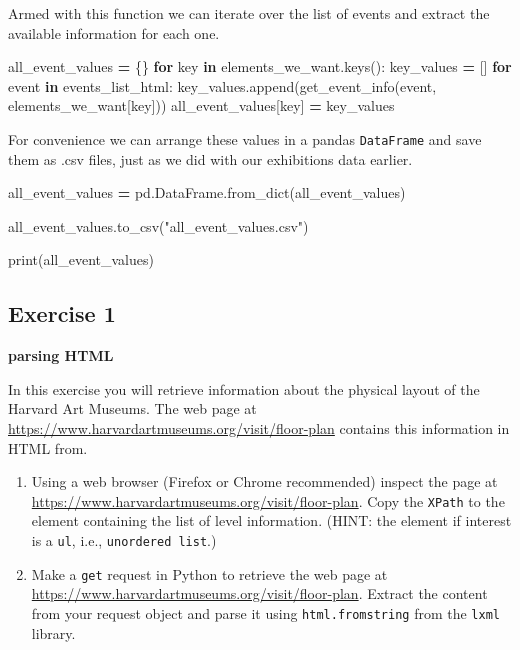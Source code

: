 \documentclass[]{book}
\newenvironment{Shaded}{\begin{snugshade}}{\end{snugshade}}
\newcommand{\BuiltInTok}[1]{#1}
\newcommand{\ControlFlowTok}[1]{\textcolor[rgb]{0.13,0.29,0.53}{\textbf{#1}}}
\newcommand{\KeywordTok}[1]{\textcolor[rgb]{0.13,0.29,0.53}{\textbf{#1}}}
\newcommand{\NormalTok}[1]{#1}
\newcommand{\OperatorTok}[1]{\textcolor[rgb]{0.81,0.36,0.00}{\textbf{#1}}}
\newcommand{\StringTok}[1]{\textcolor[rgb]{0.31,0.60,0.02}{#1}}
\begin{document}
Armed with this function we can iterate over the list of events and extract the available information for each one.

\begin{Shaded}
\begin{Highlighting}[]
\NormalTok{all_event_values }\OperatorTok{=}\NormalTok{ \{\}}
\ControlFlowTok{for}\NormalTok{ key }\KeywordTok{in}\NormalTok{ elements_we_want.keys():}
\NormalTok{    key_values }\OperatorTok{=}\NormalTok{ []}
    \ControlFlowTok{for}\NormalTok{ event }\KeywordTok{in}\NormalTok{ events_list_html: }
\NormalTok{        key_values.append(get_event_info(event, elements_we_want[key]))}
\NormalTok{    all_event_values[key] }\OperatorTok{=}\NormalTok{ key_values}
\end{Highlighting}
\end{Shaded}

For convenience we can arrange these values in a pandas \texttt{DataFrame} and save them as .csv files, just as we did with our exhibitions data earlier.

\begin{Shaded}
\begin{Highlighting}[]
\NormalTok{all_event_values }\OperatorTok{=}\NormalTok{ pd.DataFrame.from_dict(all_event_values)}

\NormalTok{all_event_values.to_csv(}\StringTok{"all_event_values.csv"}\NormalTok{)}

\BuiltInTok{print}\NormalTok{(all_event_values)}
\end{Highlighting}
\end{Shaded}

\hypertarget{exercise-1-5}{%
\subsection{Exercise 1}\label{exercise-1-5}}

\textbf{parsing HTML}

In this exercise you will retrieve information about the physical layout of the Harvard Art Museums. The web page at
\url{https://www.harvardartmuseums.org/visit/floor-plan} contains this information in HTML from.

\begin{enumerate}
\def\labelenumi{\arabic{enumi}.}
\item
  Using a web browser (Firefox or Chrome recommended) inspect the
  page at \url{https://www.harvardartmuseums.org/visit/floor-plan}. Copy
  the \texttt{XPath} to the element containing the list of level
  information. (HINT: the element if interest is a \texttt{ul}, i.e.,
  \texttt{unordered\ list}.)
\item
  Make a \texttt{get} request in Python to retrieve the web page at
  \url{https://www.harvardartmuseums.org/visit/floor-plan}. Extract the
  content from your request object and parse it using \texttt{html.fromstring}
  from the \texttt{lxml} library.
\end{enumerate}
\end{document}
